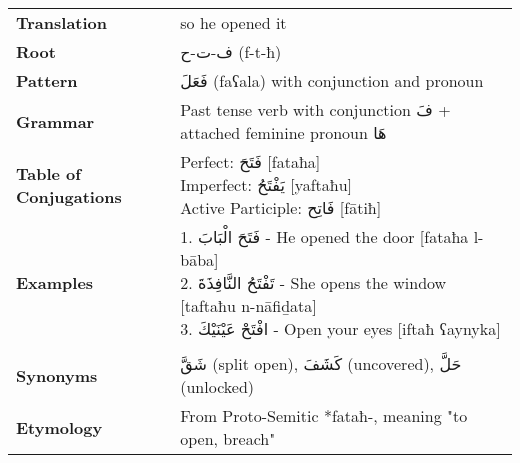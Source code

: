 \documentclass[letterpaper,12pt]{article}
\begin{document}
\begin{tabular}{p{3cm}p{10cm}}
\toprule
\textbf{Translation} & so he opened it \\
\textbf{Root} & \textarabic{ف-ت-ح} (f-t-ħ) \\
\textbf{Pattern} & \textarabic{فَعَلَ} (faʕala) with conjunction and pronoun \\
\textbf{Grammar} & Past tense verb with conjunction \textarabic{فَ} + attached feminine pronoun \textarabic{هَا} \\
\textbf{Table of Conjugations} & \makecell[l]{
Perfect: \textarabic{فَتَحَ} [fataħa]\\
Imperfect: \textarabic{يَفْتَحُ} [yaftaħu]\\
Active Participle: \textarabic{فَاتِح} [fātiħ]
} \\
\textbf{Examples} & \makecell[l]{\parbox{9.5cm}{
1. \textarabic{فَتَحَ الْبَابَ} - He opened the door [fataħa l-bāba]\\
2. \textarabic{تَفْتَحُ النَّافِذَةَ} - She opens the window [taftaħu n-nāfiḏata]\\
3. \textarabic{افْتَحْ عَيْنَيْكَ} - Open your eyes [iftaħ ʕaynyka]
}} \\
\midrule \\
\textbf{Synonyms} & \textarabic{شَقَّ} (split open), \textarabic{كَشَفَ} (uncovered), \textarabic{حَلَّ} (unlocked) \\
\textbf{Etymology} & From Proto-Semitic *fataħ-, meaning "to open, breach" \\
\bottomrule
\end{tabular}
\end{document}
